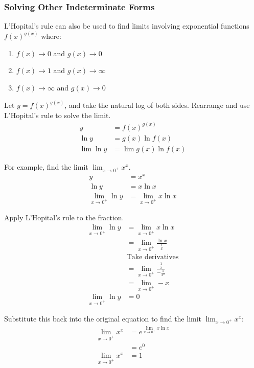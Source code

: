 \documentclass[12pt]{article}
\begin{document}
\subsubsection{Solving Other Indeterminate Forms}

L'Hopital's rule can also be used to find limits involving exponential functions $f(x)^{g(x)}$ where:

\begin{enumerate}
	\item $f(x) \to 0$ and $g(x) \to 0$
	\item $f(x) \to 1$ and $g(x) \to \infty$
	\item $f(x) \to \infty$ and $g(x) \to 0$
\end{enumerate}

Let $y = f(x)^{g(x)}$, and take the natural log of both sides. Rearrange and use L'Hopital's rule to solve the limit.
\begin{align*}
	y          & = f(x)^{g(x)}        \\
	\ln y      & = g(x) \ln f(x)      \\
	\lim \ln y & = \lim g(x) \ln f(x)
\end{align*}

\noindent For example, find the limit $\lim_{x \to 0^+} x^x$.
\begin{align*}
	y                      & = x^x                      \\
	\ln y                  & = x \ln x                  \\
	\lim_{x \to 0^+} \ln y & = \lim_{x \to 0^+} x \ln x
\end{align*}

\noindent Apply L'Hopital's rule to the fraction.
\begin{align*}
	\lim_{x \to 0^+} \ln y & = \lim_{x \to 0^+} x \ln x                            \\[6pt]
	& = \lim_{x \to 0^+} \frac{\ln x}{\frac{1}{x}}          \\[6pt]
	& \text{Take derivatives}                               \\
	& = \lim_{x \to 0^+} \frac{\frac{1}{x}}{-\frac{1}{x^2}} \\[6pt]
	& = \lim_{x \to 0^+} -x                                 \\
	\lim_{x \to 0^+} \ln y & = 0
\end{align*}

\noindent Substitute this back into the original equation to find the limit $\lim_{x \to 0^+} x^x$:
\begin{align*}
	\lim_{x \to 0^+} x^x & = e^{\lim_{x \to 0^+} x \ln x} \\
	& = e^{0}                        \\
	\lim_{x \to 0^+} x^x & = 1
\end{align*}
\end{document}
